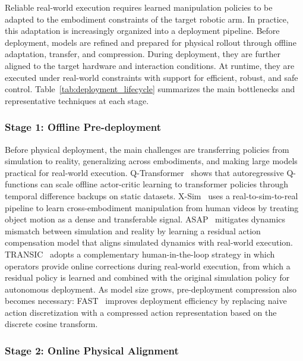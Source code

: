\documentclass[acmsmall,screen,review]{acmart}
\begin{document}
Reliable real-world execution requires learned manipulation policies to be adapted to the embodiment constraints of the target robotic arm.
In practice, this adaptation is increasingly organized into a deployment pipeline.
Before deployment, models are refined and prepared for physical rollout through offline adaptation, transfer, and compression.
During deployment, they are further aligned to the target hardware and interaction conditions.
At runtime, they are executed under real-world constraints with support for efficient, robust, and safe control.
Table~\ref{tab:deployment_lifecycle} summarizes the main bottlenecks and representative techniques at each stage.

\subsubsection{Stage 1: Offline Pre-deployment}\label{subsec:pre_deployment}

Before physical deployment, the main challenges are transferring policies from simulation to reality, generalizing across embodiments, and making large models practical for real-world execution.
Q-Transformer~\cite{chebotar2023qtransformer} shows that autoregressive Q-functions can scale offline actor-critic learning to transformer policies through temporal difference backups on static datasets.
X-Sim~\cite{dan2025xsim} uses a real-to-sim-to-real pipeline to learn cross-embodiment manipulation from human videos by treating object motion as a dense and transferable signal.
ASAP~\cite{he2025asap} mitigates dynamics mismatch between simulation and reality by learning a residual action compensation model that aligns simulated dynamics with real-world execution.
TRANSIC~\cite{jiang2025transic} adopts a complementary human-in-the-loop strategy in which operators provide online corrections during real-world execution, from which a residual policy is learned and combined with the original simulation policy for autonomous deployment.
As model size grows, pre-deployment compression also becomes necessary: FAST~\cite{pertsch2025fast} improves deployment efficiency by replacing naive action discretization with a compressed action representation based on the discrete cosine transform.

\subsubsection{Stage 2: Online Physical Alignment}\label{subsec:online_alignment}
\end{document}
